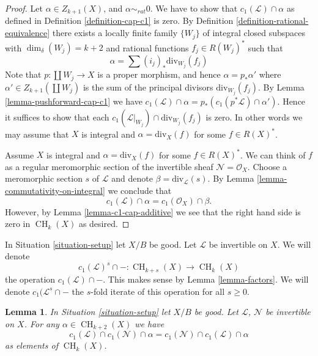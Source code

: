 \documentclass{stacks-project}
\theoremstyle{plain}
\newtheorem{lemma}[subsection]{Lemma}
\theoremstyle{definition}
\theoremstyle{remark}
\numberwithin{equation}{subsection}
\def\CH{\mathop{\mathrm{CH}}\nolimits}
\begin{document}
\begin{proof}
Let $\alpha \in Z_{k + 1}(X)$, and $\alpha \sim_{rat} 0$.
We have to show that $c_1(\mathcal{L}) \cap \alpha$
as defined in Definition \ref{definition-cap-c1} is zero.
By Definition \ref{definition-rational-equivalence} there
exists a locally finite family $\{W_j\}$ of integral closed
subspaces with $\dim_\delta(W_j) = k + 2$ and rational functions
$f_j \in R(W_j)^*$ such that
$$
\alpha = \sum (i_j)_*\text{div}_{W_j}(f_j)
$$
Note that $p : \coprod W_j \to X$ is a proper morphism,
and hence $\alpha = p_*\alpha'$ where $\alpha' \in Z_{k + 1}(\coprod W_j)$
is the sum of the principal divisors $\text{div}_{W_j}(f_j)$.
By Lemma \ref{lemma-pushforward-cap-c1} we have
$c_1(\mathcal{L}) \cap \alpha = p_*(c_1(p^*\mathcal{L}) \cap \alpha')$.
Hence it suffices to show that each
$c_1(\mathcal{L}|_{W_j}) \cap \text{div}_{W_j}(f_j)$ is zero.
In other words we may assume that $X$ is integral and
$\alpha = \text{div}_X(f)$ for some $f \in R(X)^*$.

\medskip\noindent
Assume $X$ is integral and $\alpha = \text{div}_X(f)$ for some $f \in R(X)^*$.
We can think of $f$ as a regular meromorphic section of the invertible
sheaf $\mathcal{N} = \mathcal{O}_X$. Choose a meromorphic section
$s$ of $\mathcal{L}$ and denote $\beta = \text{div}_\mathcal{L}(s)$.
By Lemma \ref{lemma-commutativity-on-integral}
we conclude that
$$
c_1(\mathcal{L}) \cap \alpha = c_1(\mathcal{O}_X) \cap \beta.
$$
However, by Lemma \ref{lemma-c1-cap-additive} we see that the right hand side
is zero in $\CH_k(X)$ as desired.
\end{proof}

\noindent
In Situation \ref{situation-setup} let $X/B$ be good.
Let $\mathcal{L}$ be invertible on $X$.
We will denote
$$
c_1(\mathcal{L})^s \cap - : \CH_{k + s}(X) \to \CH_k(X)
$$
the operation $c_1(\mathcal{L}) \cap - $. This makes sense by
Lemma \ref{lemma-factors}. We will denote $c_1(\mathcal{L}^s \cap -$
the $s$-fold iterate of this operation for all $s \geq 0$.

\begin{lemma}
\label{lemma-cap-commutative}
In Situation \ref{situation-setup} let $X/B$ be good.
Let $\mathcal{L}$, $\mathcal{N}$ be invertible on $X$.
For any $\alpha \in \CH_{k + 2}(X)$ we have
$$
c_1(\mathcal{L}) \cap c_1(\mathcal{N}) \cap \alpha
=
c_1(\mathcal{N}) \cap c_1(\mathcal{L}) \cap \alpha
$$
as elements of $\CH_k(X)$.
\end{lemma}
\end{document}
